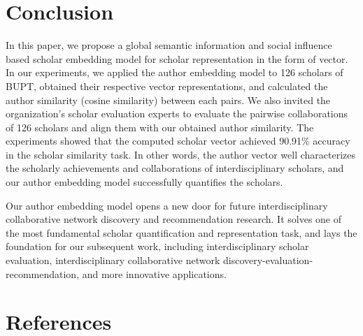 \documentclass[a4paper]{jpconf}
\begin{document}
\newpage
\section{Conclusion}
In this paper, we propose a global semantic information and social influence
based scholar embedding model for scholar representation in the form of vector.
In our experiments, we applied the author embedding model to 126 scholars of BUPT,
obtained their respective vector representations, and calculated the 
author similarity (cosine similarity) between each pairs. We also invited the organization's scholar evaluation experts to evaluate the pairwise collaborations of 126 scholars and align them with our obtained author similarity. The experiments showed that the computed scholar vector 
achieved 90.91\% accuracy in the scholar similarity task. In other words, 
the author vector well characterizes the scholarly achievements and 
collaborations of interdisciplinary scholars, and our author embedding 
model successfully quantifies the scholars.

Our author embedding model opens a new door for future interdisciplinary
collaborative network discovery and recommendation research. It solves
one of the most fundamental scholar quantification and representation task,
and lays the foundation for our subsequent work, including
interdisciplinary scholar evaluation, interdisciplinary collaborative
network discovery-evaluation-recommendation, and more innovative applications.




\section{References}


\end{document}

